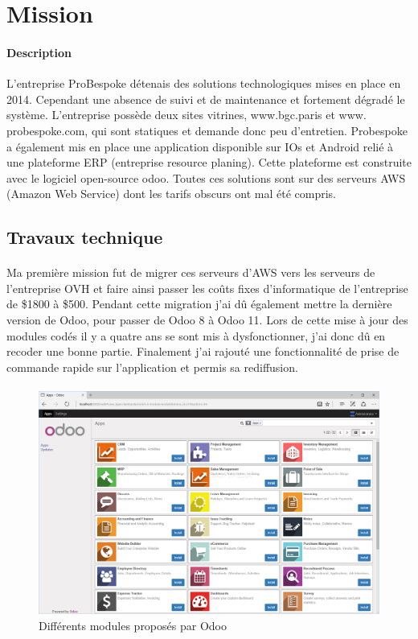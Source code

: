 \section{Mission}

\paragraph{Description}
L'entreprise ProBespoke détenais des solutions technologiques mises en place en 2014.
Cependant une absence de suivi et de maintenance et fortement dégradé le système. L'entreprise possède deux sites vitrines, www.bgc.paris et www. probespoke.com, qui sont statiques et demande donc peu d'entretien.
Probespoke a également mis en place une application disponible sur IOs et Android relié à une plateforme ERP (entreprise resource planing). Cette plateforme est construite avec le logiciel open-source odoo.
 Toutes ces solutions sont sur des serveurs AWS (Amazon Web Service) dont les tarifs obscurs ont mal été compris.
\subsection{Travaux technique}
\paragraph{}
 Ma première mission fut de migrer ces serveurs d'AWS vers les serveurs de l'entreprise OVH et faire ainsi passer les coûts fixes d'informatique de l'entreprise de \$1800 à \$500.
 Pendant cette migration j'ai dû également mettre la dernière version de Odoo, pour passer de Odoo 8 à Odoo 11.
 Lors de cette mise à jour des modules codés il y a quatre ans se sont mis à dysfonctionner, j'ai donc dû en recoder une bonne partie. Finalement j'ai rajouté une fonctionnalité de prise de commande rapide sur l'application et permis sa rediffusion.
 \paragraph{}

 \begin{figure}[!h]
 \centering
 \includegraphics[width=12cm]{image/odoo.png}
 \caption{Différents modules proposés par Odoo}
 \end{figure}

